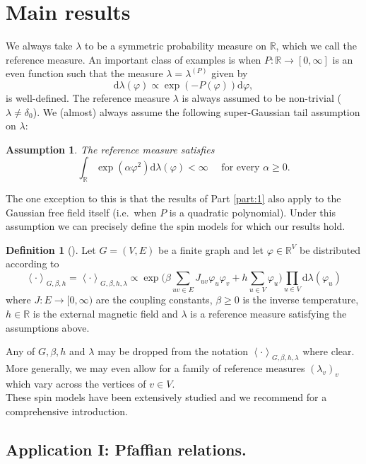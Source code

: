 \documentclass{article}
\newtheorem{asum}[]{Assumption}
\numberwithin{equation}{section}
\theoremstyle{definition}
\theoremstyle{definition}
\newtheorem{definition}{Definition}
\theoremstyle{remark}
\renewcommand{\d}{\mathrm{d}}
\newcommand\vp{\varphi}
\newcommand\R{\mathbb{R}}
\renewcommand{\d}{\mathrm{d}}
\renewcommand{\l}{\lambda}
\begin{document}
\section{Main results}
We always take $\l$ to be a symmetric probability measure on $\R$, which we call the reference measure. An important class of examples is when $P : \R \to \left[ 0,\infty \right]$ is an even function such that the measure $\l = \l^{(P)}$ given by 
\[
\d\l(\vp) \propto \exp( - P(\vp)) \d \vp,
\]
is well-defined. The reference measure $\l$ is always assumed to be non-trivial ($\l \neq \delta_0$). We (almost) always assume the following super-Gaussian tail assumption on $\l$:
\begin{asum}\label{asum:one}	The reference measure satisfies		
\[
				\int_\R \exp( \alpha \vp^2) \d\l(\vp) < \infty \quad \text{ for every }\alpha \geq 0.
\]
\end{asum}
The one exception to this is that the results of Part \ref{part:1} also apply to the Gaussian free field itself (i.e.~when $P$ is a quadratic polynomial). Under this assumption we can precisely define the spin models for which our results hold.
\begin{definition}[]\label{def:spinmodel}
Let $G=(V,E)$ be a finite graph and let $\vp \in \R^V$ be distributed according to
\begin{equation}\label{eq:spinsystem}
	\left< \cdot \right>_{G,\beta,h} = \left< \cdot  \right>_{G,\beta, h, \l} \propto \exp\Big( \beta \sum_{uv \in E} J_{uv} \vp_u \vp_v  + h \sum_{u \in V}  \vp_u \Big) \prod_{u \in V} \d\l(\vp_u)
\end{equation} 
where $J : E \to [0,\infty)$ are the coupling constants, $\beta \geq 0$ is the inverse temperature, $h \in \R$ is the external magnetic field and $\l$ is a reference measure satisfying the assumptions above. 
\end{definition}
Any of $G,\beta,h$ and $\l$ may be dropped from the notation $\left< \cdot \right>_{G,\beta,h,\l}$ where clear.
More generally, we may even allow for a family of reference measures $(\l_v)_v$ which vary across the vertices of $v \in V$.
\\[1em]
\noindent These spin models have been extensively studied and we recommend \cite{simon2026phase} for a comprehensive introduction.
\subsection{Application I: Pfaffian relations.}\label{sec:app2}\mbox{}\par
\end{document}
